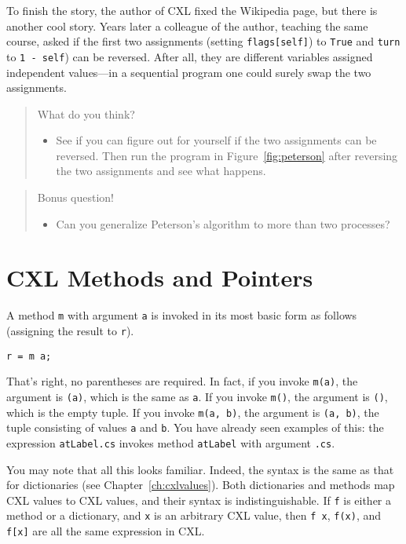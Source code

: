 \documentclass{report}
\newenvironment{code}{
\tcolorbox
}{
\endtcolorbox
}
\begin{document}
To finish the story, the author of CXL fixed the Wikipedia page, but there
is another cool story.  Years later a colleague of the author, teaching
the same course, asked if the first two assignments (setting \texttt{flags[self]})
to \texttt{True} and \texttt{turn} to \texttt{1 - self}) can be reversed.
After all, they are different variables assigned independent values---in a
sequential program one could surely swap the two assignments.

\begin{quote}
What do you think?
\begin{itemize}
\item See if you can figure out for yourself if the two assignments can be
reversed.  Then run the program in Figure~\ref{fig:peterson} after reversing
the two assignments and see what happens.
\end{itemize}
\end{quote}

\begin{quote}
Bonus question!
\begin{itemize}
\item Can you generalize Peterson's algorithm to more than two processes?
\end{itemize}
\end{quote}

\chapter{CXL Methods and Pointers}

A method \texttt{m} with argument \texttt{a} is invoked in its
most basic form as follows (assigning the result to \texttt{r}).
\begin{code}
\begin{verbatim}
r = m a;
\end{verbatim}
\end{code}
That's right, no parentheses are required.  In fact, if you invoke
\texttt{m(a)}, the argument is \texttt{(a)}, which is the same
as \texttt{a}.
If you invoke \texttt{m()}, the argument is \texttt{()},
which is the empty tuple.
If you invoke \texttt{m(a, b)}, the argument is \texttt{(a, b)},
the tuple consisting of values \texttt{a} and \texttt{b}.
You have already seen examples of this: the expression
\texttt{atLabel.cs} invokes method \texttt{atLabel} with
argument \texttt{.cs}.

You may note that all this looks familiar.  Indeed, the syntax
is the same as that for dictionaries (see Chapter~\ref{ch:cxlvalues}).
Both dictionaries and methods map CXL values to CXL values,
and their syntax is indistinguishable.
If \texttt{f} is either a method or a
dictionary, and \texttt{x} is an arbitrary CXL value, then
\texttt{f x}, \texttt{f(x)}, and \texttt{f[x]} are all
the same expression in CXL.
\end{document}
